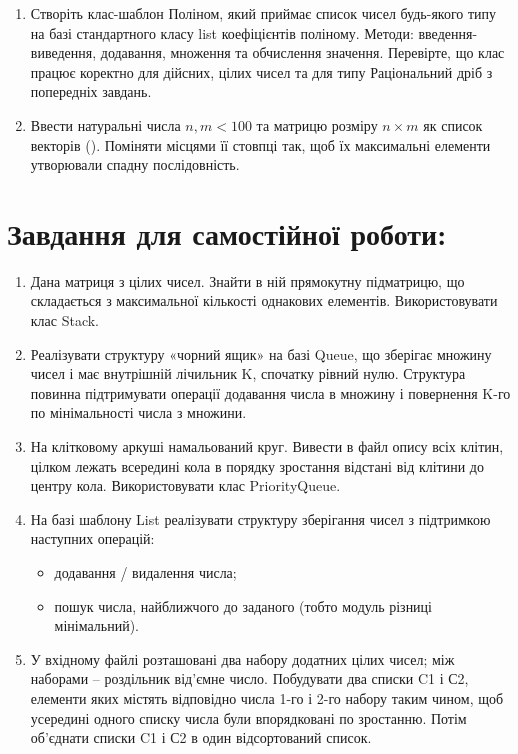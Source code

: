 \documentclass[a5paper,titlepage,openany,twoside,
]
{book_unv}%
\begin{document}
\begin{enumerate}
\begin{enumerate}
\begin{enumerate}
\item
  Створіть клас-шаблон Поліном, який приймає список чисел будь-якого
  типу на базі стандартного класу list коефіцієнтів
  поліному. Методи: введення-виведення, додавання, множення та
  обчислення значення. Перевірте, що клас працює коректно для дійсних,
  цілих чисел та для типу Раціональний дріб з попередніх завдань.
\item
Ввести натуральні числа $n,m<100$ та матрицю розміру $n \times m$ як
 список векторів (). Поміняти місцями її стовпці так, щоб їх
  максимальні елементи утворювали спадну послідовність.
\end{enumerate}

\section{Завдання для самостійної роботи:}

\begin{enumerate}
\def\labelenumi{\arabic{enumi})}
\setcounter{enumi}{4}

\item
  Дана матриця з цілих чисел. Знайти в ній прямокутну підматрицю, що
  складається з максимальної кількості однакових елементів.
  Використовувати клас Stack.
\item
  Реалізувати структуру «чорний ящик» на базі Queue, що зберігає множину
  чисел і має внутрішній лічильник K, спочатку рівний нулю. Структура
  повинна підтримувати операції додавання числа в множину і повернення
  K-го по мінімальності числа з множини.
\item
  На клітковому аркуші намальований круг. Вивести в файл опису всіх
  клітин, цілком лежать всередині кола в порядку зростання відстані від
  клітини до центру кола. Використовувати клас PriorityQueue.
\item
  На базі шаблону List реалізувати структуру зберігання чисел з
  підтримкою наступних операцій:

  \begin{itemize}
    \item
    додавання / видалення числа;
  \item
    пошук числа, найближчого до заданого (тобто модуль різниці
    мінімальний).
  \end{itemize}
\item
  У вхідному файлі розташовані два набору додатних цілих чисел; між наборами
  -- роздільник від'ємне число. Побудувати два списки C1 і С2, елементи яких
  містять відповідно числа 1-го і 2-го набору таким чином, щоб усередині
  одного списку числа були впорядковані по зростанню. Потім об'єднати
  списки C1 і С2 в один відсортований список.


\end{enumerate}
\end{enumerate}
\end{enumerate}
\end{document}
